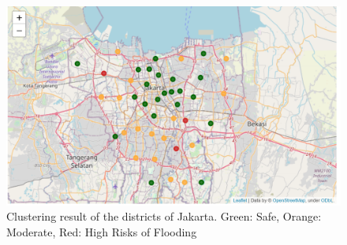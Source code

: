 \begin{figure}
\begin{center}
\graphicspath{ {./Pict/} }
\includegraphics[scale=0.8]{cluster.png}
\caption{Clustering result of the districts of Jakarta. Green: Safe, Orange: Moderate, Red: High Risks of Flooding}\label{fig=cluster.png}
\end{center}
\end{figure}

